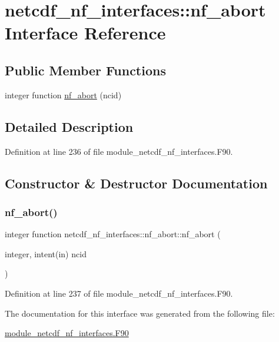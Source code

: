 \hypertarget{interfacenetcdf__nf__interfaces_1_1nf__abort}{}\section{netcdf\+\_\+nf\+\_\+interfaces\+:\+:nf\+\_\+abort Interface Reference}
\label{interfacenetcdf__nf__interfaces_1_1nf__abort}
\subsection*{Public Member Functions}
\begin{DoxyCompactItemize}
\item 
integer function \hyperlink{interfacenetcdf__nf__interfaces_1_1nf__abort_a33d63275f43183fd0f4b80e5000303ee}{nf\+\_\+abort} (ncid)
\end{DoxyCompactItemize}


\subsection{Detailed Description}


Definition at line 236 of file module\+\_\+netcdf\+\_\+nf\+\_\+interfaces.\+F90.



\subsection{Constructor \& Destructor Documentation}
\mbox{\label{interfacenetcdf__nf__interfaces_1_1nf__abort_a33d63275f43183fd0f4b80e5000303ee}} 
\subsubsection{\texorpdfstring{nf\+\_\+abort()}{nf\_abort()}}
{\footnotesize\ttfamily integer function netcdf\+\_\+nf\+\_\+interfaces\+::nf\+\_\+abort\+::nf\+\_\+abort (\begin{DoxyParamCaption}\item[{integer, intent(in)}]{ncid }\end{DoxyParamCaption})}



Definition at line 237 of file module\+\_\+netcdf\+\_\+nf\+\_\+interfaces.\+F90.



The documentation for this interface was generated from the following file\+:\begin{DoxyCompactItemize}
\item 
\hyperlink{module__netcdf__nf__interfaces_8F90}{module\+\_\+netcdf\+\_\+nf\+\_\+interfaces.\+F90}\end{DoxyCompactItemize}
